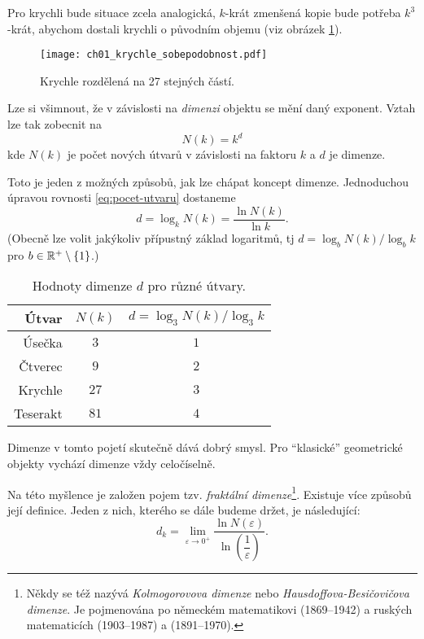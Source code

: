 Pro krychli bude situace zcela analogická, $k$-krát zmenšená kopie bude potřeba $k^3$-krát, abychom dostali krychli o původním objemu (viz obrázek \ref{fig:krychle-sobepodobnost}).
\begin{figure}[h]
    \centering
    \texttt{[image: ch01\_krychle\_sobepodobnost.pdf]}
    \caption{Krychle rozdělená na 27 stejných částí.}
    \label{fig:krychle-sobepodobnost}
\end{figure}
Lze si všimnout, že v závislosti na \emph{dimenzi} objektu se mění daný exponent. Vztah lze tak zobecnit na
\begin{equation}\label{eq:pocet-utvaru}
    N(k)=k^d
\end{equation}
kde $N(k)$ je počet nových útvarů v závislosti na faktoru $k$ a $d$ je dimenze.\par
Toto je jeden z možných způsobů, jak lze chápat koncept dimenze. Jednoduchou úpravou rovnosti \eqref{eq:pocet-utvaru} dostaneme
\[d=\log_k{N(k)}=\dfrac{\ln{N(k)}}{\ln{k}}.\]
(Obecně lze volit jakýkoliv přípustný základ logaritmů, tj $d=\log_b{N(k)}/\log_b{k}$ pro $b\in\mathbb{R}^+\setminus\left\{1\right\}$.)
\begin{table}[h]
    \centering
    \begin{tabular}{r|cc}
    Útvar    & $N(k)$ & $d=\log_3{N(k)}/\log_3{k}$ \\ \hline
    Úsečka   & $3$      & $1$                          \\
    Čtverec  & $9$      & $2$                          \\
    Krychle  & $27$     & $3$                          \\
    Teserakt & $81$     & $4$                          \\
    \end{tabular}
    \caption{Hodnoty dimenze $d$ pro různé útvary.}
    \label{table:eukleides-dimenze}
\end{table}
Dimenze v tomto pojetí skutečně dává dobrý smysl. Pro ``klasické'' geometrické objekty vychází dimenze vždy celočíselně.\par
Na této myšlence je založen pojem tzv. \emph{fraktální dimenze}\footnote{Někdy se též nazývá \emph{Kolmogorovova dimenze} nebo \emph{Hausdoffova-Besičovičova dimenze}. Je pojmenována po německém matematikovi  (1869--1942) a ruských matematicích  (1903--1987) a  (1891--1970).}. Existuje více způsobů její definice. Jeden z nich, kterého se dále budeme držet, je následující:
\begin{equation}\label{eq:fraktalni-dimenze}
    d_k=\lim_{\varepsilon\to 0^+}{\dfrac{\ln{N(\varepsilon)}}{\ln{\left(\dfrac{1}{\varepsilon}\right)}}}.
\end{equation}
